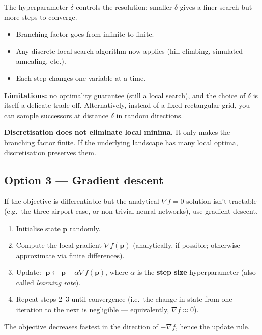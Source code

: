 \documentclass[11pt, a4paper]{article}
\begin{document}
The hyperparameter $\delta$ controls the resolution: smaller $\delta$ gives a finer search but more steps to converge.

\begin{itemize}
  \item Branching factor goes from infinite to finite.
  \item Any discrete local search algorithm now applies (hill climbing, simulated annealing, etc.).
  \item Each step changes one variable at a time.
\end{itemize}

\textbf{Limitations:} no optimality guarantee (still a local search), and the choice of $\delta$ is itself a delicate trade-off. Alternatively, instead of a fixed rectangular grid, you can sample successors at distance $\delta$ in random directions.

\textbf{Discretisation does not eliminate local minima.} It only makes the branching factor finite. If the underlying landscape has many local optima, discretisation preserves them.

\subsection{Option 3 — Gradient descent}

If the objective is differentiable but the analytical $\nabla f = 0$ solution isn't tractable (e.g.\ the three-airport case, or non-trivial neural networks), use gradient descent.

\begin{defbox}
\begin{enumerate}
  \item Initialise state $\mathbf{p}$ randomly.
  \item Compute the local gradient $\nabla f(\mathbf{p})$ (analytically, if possible; otherwise approximate via finite differences).
  \item Update: $\;\mathbf{p} \leftarrow \mathbf{p} - \alpha \nabla f(\mathbf{p})$, where $\alpha$ is the \textbf{step size} hyperparameter (also called \emph{learning rate}).
  \item Repeat steps 2--3 until convergence (i.e.\ the change in state from one iteration to the next is negligible — equivalently, $\nabla f \approx 0$).
\end{enumerate}
The objective decreases fastest in the direction of $-\nabla f$, hence the update rule.
\end{defbox}
\end{document}
